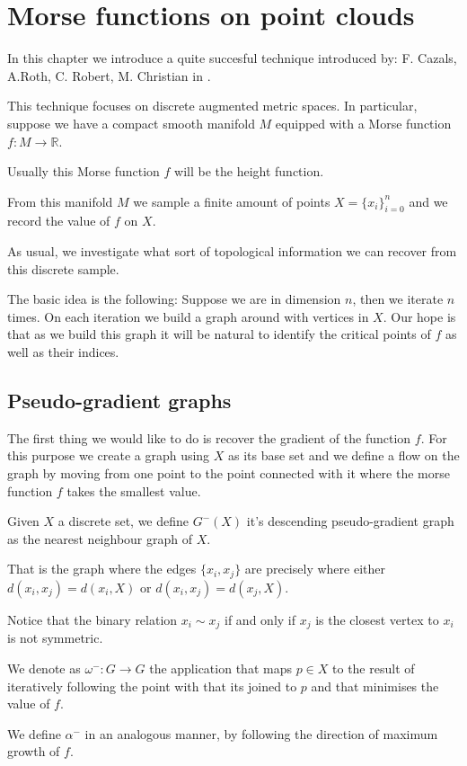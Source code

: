 \chapter{Morse functions on point clouds}

In this chapter we introduce a quite succesful technique introduced by: 
F. Cazals, A.Roth, C. Robert, M. Christian
in \cite{caz2013}.

This technique focuses on discrete augmented metric spaces.
In particular, suppose we have a compact smooth manifold
$M$ equipped with a Morse function $f:M\to \mathbb{R}$.

Usually this Morse function $f$ will be the height function.

From this manifold $M$ we sample a finite amount of points 
$X=\{x_i\}_{i=0}^n$ and we record the value of $f$ on $X$.

As usual, we investigate what sort of topological information we can recover from this
discrete sample.


The basic idea is the following: Suppose we are in dimension $n$,
then we iterate $n$ times. On each iteration we build a graph around with vertices in $X$.
Our hope is that as we build this graph it will be natural to identify the critical points of $f$ as
well as their indices.

\section{Pseudo-gradient graphs}

The first thing we would like to do is recover the gradient of the function $f$.
For this purpose we create a graph using $X$ as its base set
and we define a flow on the graph by moving from one point to the point
connected with it where the morse function $f$ takes the smallest value.

\begin{definition}

Given $X$ a discrete set,
we define $G^-(X)$ it's descending pseudo-gradient graph
as the nearest neighbour graph of $X$. 

That is the graph where the 
edges $\{x_i,x_j\}$ are precisely where either $d(x_i,x_j)=d(x_i,X)$
or $d(x_i,x_j)=d(x_j,X)$. 

Notice that the binary relation $x_i\sim x_j$ if 
and only if
$x_j$ is the closest vertex to $x_i$ is not symmetric.

We denote as $\omega^-:G\to G$ the application that
maps $p\in X$ to the result of iteratively following the point
with that its joined to $p$ and that minimises the value of $f$.

We define $\alpha^-$ in an analogous manner, by following the direction 
of maximum growth of $f$.
\end{definition}

